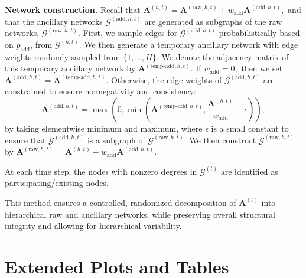 \documentclass{article}
\theoremstyle{plain}
\theoremstyle{definition}
\theoremstyle{remark}
\begin{document}
\textbf{Network construction.}
Recall that $\mathbf{A}^{(h,t)}=\mathbf{A}^{(\text{raw}, h, t)} + w_\text{add}\mathbf{A}^{(\text{add}, h, t)},$ and that the ancillary networks $\mathcal{G}^{(\text{add}, h, t)}$ are generated as subgraphs of the raw networks, $\mathcal{G}^{(\text{raw}, h, t)}$. First, we sample edges for $\mathcal{G}^{(\text{add}, h, t)}$ probabilistically based on $ p_{\text{add}}$, from $\mathcal{G}^{(h, t)}$. We then generate a temporary ancillary network with edge weights randomly sampled from $\{1, \dots, H\}.$ We denote the adjacency matrix of this temporary ancillary network by $\mathbf{A}^{(\text{temp-add}, h, t)}$. If $w_\text{add}=0,$ then we set $\mathbf{A}^{(\text{add}, h, t)}=\mathbf{A}^{(\text{temp-add}, h, t)}$. Otherwise, the edge weights of $\mathcal{G}^{(\text{add}, h, t)}$  are constrained to ensure nonnegativity and consistency:
$$
\mathbf{A}^{(\text{add}, h, t)}=\max\left(0, \min\left(\mathbf{A}^{(\text{temp-add}, h, t)}, \frac{\mathbf{A}^{(h,t)}}{w_{\text{add}}} - \epsilon\right)\right),
$$ by taking elementwise minimum and maximum, where $\epsilon$ is a small constant to ensure that $\mathcal{G}^{(\text{add}, h, t)}$ is a subgraph of $\mathcal{G}^{(\text{raw}, h, t)}$. We then construct $\mathcal{G}^{(\text{raw}, h, t)}$ by
$\mathbf{A}^{(\text{raw}, h, t)}= \mathbf{A}^{(h,t)}- w_\text{add}\mathbf{A}^{(\text{add}, h, t)}.$

At each time step, the nodes with nonzero degrees in $\mathcal{G}^{(t)}$ are identified as participating/existing nodes. 

This method ensures a controlled, randomized decomposition of $\mathbf{A}^{(t)}$ into hierarchical raw and ancillary networks, while preserving overall structural integrity and allowing for hierarchical variability.
\section{Extended Plots and Tables}
\label{app_sec:extended_plots_and_tables}
\end{document}
